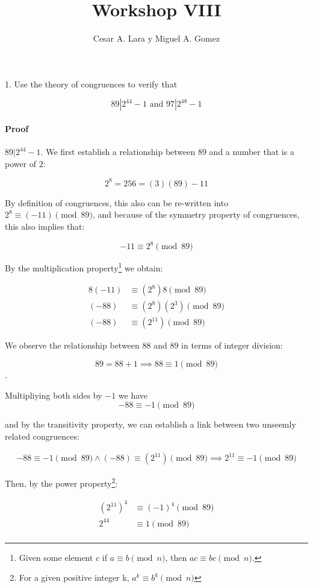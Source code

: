 \documentclass{article}
\title{Workshop VIII}
\author{Cesar A. Lara y Miguel A. Gomez}
\begin{document}
	\maketitle

\paragraph{}1. Use the theory of congruences to verify that

$$89|2^{44} - 1 \text{ and } 97|2^{48} - 1$$

\paragraph{Proof} $89|2^{44} - 1$. We first establish a relationship between $89$ and a number that is a power of $2$:

$$2^8 = 256 = (3)(89)-11$$

By definition of congruences, this also can be re-written into $2^{8} \equiv (-11)\pmod{ 89}$, and because of the symmetry property of congruences, this also implies that:

$$-11 \equiv {2^{8}}\pmod{89}$$

By the multiplication property\footnote{Given some element $c$ if $a \equiv b\pmod{n}$, then $ac \equiv bc \pmod{n}$.} we obtain:

\begin{align*}
	8(-11) &\equiv (2^8)8 \pmod{89}\\
	(-88) &\equiv (2^{8}) (2^{3}) \pmod{89}\\
	(-88) &\equiv (2^{11})\pmod{89}
\end{align*}

We observe the relationship between $88$ and $89$ in terms of integer division:

$$89 = 88 +1 \implies 88 \equiv 1 \pmod{89}$$.

Multipliying both sides by $-1$ we have 
$$-88 \equiv -1 \pmod{89}$$

and by the transitivity property, we can establish a link between two unseemly related congruences:

\begin{align*}
	-88 \equiv -1 \pmod{89} \land (-88) \equiv (2^{11})\pmod{89} \implies 2^{11} \equiv -1 \pmod{89}
\end{align*}

Then, by the power property\footnote{For a given positive integer k, $a^k \equiv b^k \pmod{n}$}:

\begin{align*}
	(2^{11})^{4} &\equiv (-1)^4 \pmod{89}\\
	2^{44} &\equiv 1 \pmod{89}\\
\end{align*}
\end{document}
